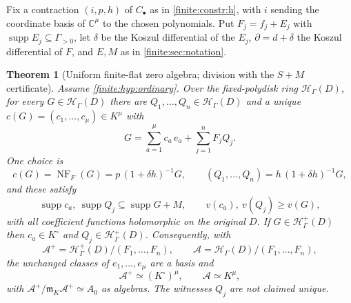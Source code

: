 \documentclass[11pt,letterpaper]{article}
\newtheorem{theorem}{Theorem}[section]
\theoremstyle{definition}
\theoremstyle{remark}
\newcommand{\C}{\mathbb C}
\newcommand{\HH}{\mathscr H}
\newcommand{\Hp}{\mathscr H^{+}}
\newcommand{\Alg}{\mathcal A}
\newcommand{\mm}{\mathfrak m}
\newcommand{\Kc}{K^{\circ}}
\DeclareMathOperator{\supp}{supp}
\DeclareMathOperator{\NF}{NF}
\numberwithin{equation}{section}
\begin{document}
Fix a contraction $(i,p,h)$ of $C_\bullet$ as in \cref{finite:constr:h}, with $i$ sending the coordinate basis of $\C^\mu$ to the chosen polynomials. Put $F_j=f_j+E_j$ with $\supp E_j\subseteq\Gamma_{>0}$, let $\delta$ be the Koszul differential of the $E_j$, $\partial=d+\delta$ the Koszul differential of $F$, and $E,M$ as in \cref{finite:sec:notation}.

\begin{theorem}[Uniform finite-flat zero algebra; division with the $S+M$ certificate]
\label{finite:thm:finitefree}
Assume \cref{finite:hyp:ordinary}. Over the fixed-polydisk ring $\HH_\Gamma(D)$, for every $G\in\HH_\Gamma(D)$ there are $Q_1,\ldots,Q_n\in\HH_\Gamma(D)$ and a \emph{unique} $c(G)=(c_1,\ldots,c_\mu)\in K^\mu$ with
\begin{equation}\label{finite:eq:division}
 G=\sum_{a=1}^{\mu}c_a\,e_a+\sum_{j=1}^{n}F_jQ_j .
\end{equation}
One choice is
\begin{equation}\label{finite:eq:NFformula}
 c(G)=\NF_F(G)=p\,(1+\delta h)^{-1}G,
 \qquad (Q_1,\ldots,Q_n)=h\,(1+\delta h)^{-1}G,
\end{equation}
and these satisfy
\begin{equation}\label{finite:eq:divisionsupport}
 \supp c_a,\ \supp Q_j\subseteq\supp G+M,
 \qquad
 v(c_a),\ v(Q_j)\geq v(G),
\end{equation}
with all coefficient functions holomorphic on the original $D$. If $G\in\Hp_\Gamma(D)$ then $c_a\in\Kc$ and $Q_j\in\Hp_\Gamma(D)$. Consequently, with
\[
 \Alg^+=\Hp_\Gamma(D)/(F_1,\ldots,F_n),
 \qquad
 \Alg=\HH_\Gamma(D)/(F_1,\ldots,F_n),
\]
the unchanged classes of $e_1,\ldots,e_\mu$ are a basis and
\begin{equation}\label{finite:eq:finitefree}
 \Alg^+\simeq(\Kc)^\mu,\qquad \Alg\simeq K^\mu ,
\end{equation}
with $\Alg^+/\mm_K\Alg^+\simeq A_0$ as algebras. The witnesses $Q_j$ are \emph{not} claimed unique.
\end{theorem}
\end{document}
